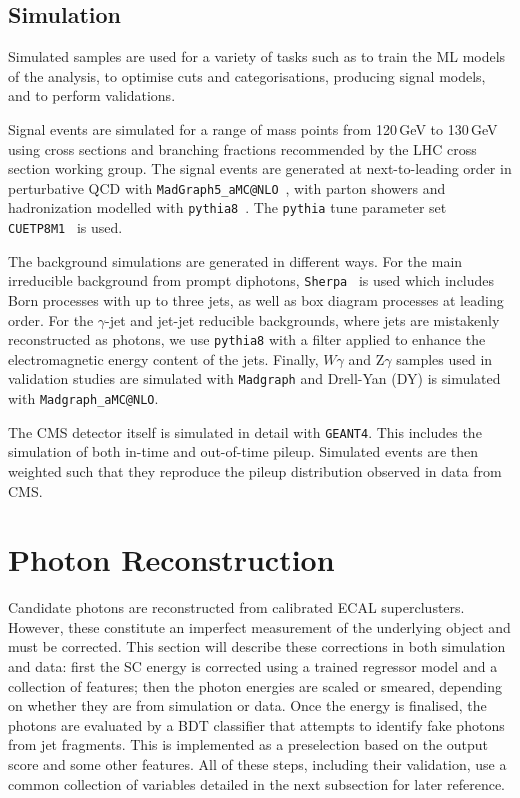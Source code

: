 \subsection{Simulation}

Simulated samples are used for a variety of tasks such as to train the ML models of the analysis, to optimise cuts and categorisations, producing signal models, and to perform validations. 

Signal events are simulated for a range of mass points from 120\,GeV to 130\,GeV using cross sections and branching fractions recommended by the LHC cross section working group. 
The signal events are generated at next-to-leading order in perturbative QCD with \texttt{MadGraph5_{}aMC@NLO}~\cite{madgraph}, with  parton showers and hadronization modelled with \texttt{pythia8}~\cite{pythia}. The \texttt{pythia} tune parameter set \texttt{CUETP8M1}~\cite{MonashTune} is used.

The background simulations are generated in different ways. For the main irreducible background from prompt diphotons, \texttt{Sherpa}~\cite{sherpa} is used which includes Born processes with up to three jets, as well as box diagram processes at leading order. 
For the $\gamma$-jet and jet-jet reducible backgrounds, where jets are mistakenly reconstructed as photons, we use \texttt{pythia8} with a filter applied to enhance the electromagnetic energy content of the jets. 
Finally, $W\gamma$ and $\mathrm{Z}\gamma$ samples used in validation studies are simulated with \texttt{Madgraph} and Drell-Yan (DY) is simulated with \texttt{Madgraph_{}aMC@NLO}.


The CMS detector itself is simulated in detail with \texttt{GEANT4}. 
This includes the simulation of both in-time and out-of-time pileup. 
Simulated events are then weighted such that they reproduce the pileup distribution observed in data from CMS.






\section{Photon Reconstruction}
Candidate photons are reconstructed from calibrated ECAL superclusters. However, these constitute an imperfect measurement of the underlying object and must be corrected. 
This section will describe these corrections in both simulation and data: first the SC energy is corrected using a trained regressor model and a collection of features; 
then the photon energies are scaled or smeared, depending on whether they are from simulation or data. 
Once the energy is finalised, the photons are evaluated by a BDT classifier that attempts to identify fake photons from jet fragments. This is implemented as a preselection based on the output score and some other features.
All of these steps, including their validation, use a common collection of variables detailed in the next subsection for later reference. 

